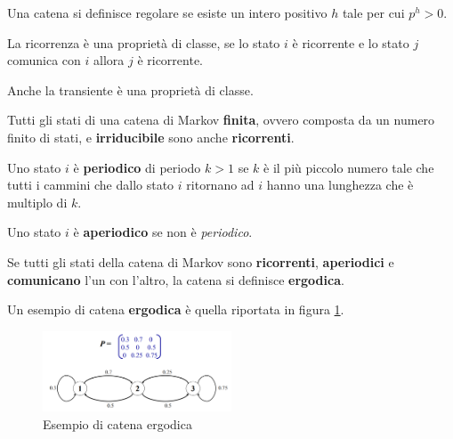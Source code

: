 \begin{definizione}
    Una catena si definisce regolare se esiste un intero positivo $h$ tale per
    cui $p^h > 0$.
\end{definizione}
\begin{nota}
    La ricorrenza è una proprietà di classe, se lo stato $i$ è ricorrente e
    lo stato $j$ comunica con $i$ allora $j$ è ricorrente.
\end{nota}
\begin{nota}
    Anche la transiente è una proprietà di classe.
\end{nota}
\begin{nota}
    Tutti gli stati di una catena di Markov \textbf{finita}, ovvero composta da
    un numero finito di stati, e \textbf{irriducibile} sono anche \textbf{ricorrenti}.
\end{nota}
\begin{definizione}
    Uno stato $i$ è \textbf{periodico} di periodo $k > 1$ se $k$ è il più piccolo
    numero tale che tutti i cammini che dallo stato $i$ ritornano ad $i$ hanno una
    lunghezza che è multiplo di $k$.
\end{definizione}
\begin{definizione}
    Uno stato $i$ è \textbf{aperiodico} se non è \textit{periodico}.
\end{definizione}
\begin{definizione}
    Se tutti gli stati della catena di Markov sono \textbf{ricorrenti}, \textbf{aperiodici}
    e \textbf{comunicano} l'un con l'altro, la catena si definisce \textbf{ergodica}.
\end{definizione}
\begin{esempio}
    Un esempio di catena \textbf{ergodica} è quella riportata in figura \ref{fig:ergodic}.
    \begin{figure}[!ht]
        \centering
        \includegraphics[width=0.5\textwidth]{img/catene/catena_ergodica.png}
        \caption{Esempio di catena ergodica}
        \label{fig:ergodic}
    \end{figure}
\end{esempio}


